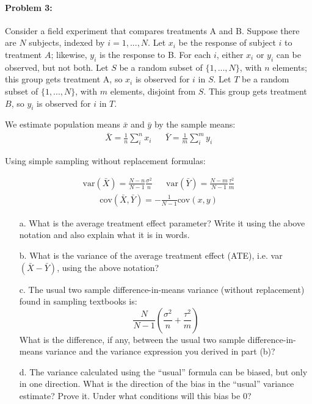 \documentclass{article}
\begin{document}
\paragraph{Problem 3:} Consider a field experiment that compares
treatments A and B. Suppose there are $N$ subjects, indexed by
$i=1,...,N$. Let $x_i$ be the response of subject $i$ to treatment
$A$; likewise, $y_i$ is the response to B. For each $i$, either $x_i$
or $y_i$ can be observed, but not both. Let $S$ be a random subset of
$\{1,...,N\}$, with $n$ elements; this group gets treatment A, so
$x_i$ is observed for $i$ in $S$. Let $T$ be a random subset of
$\{1,...,N\}$, with $m$ elements, disjoint from $S$. This group gets
treatment $B$, so $y_i$ is observed for $i$ in $T$.

We estimate population means $\bar x$ and $\bar y$ by the sample
means:
\begin{align*}
\bar X = \frac{1}{n} \sum_{i}^nx_i & &\bar Y = \frac{1}{m} \sum_{i}^my_i\end{align*}

Using simple sampling without replacement formulas:

\begin{align*}
\textrm{var}(\bar X) = \frac{N-n}{N-1}\frac{\sigma^2}{n}&
&\textrm{var}(\bar Y) = \frac{N-m}{N-1}\frac{\tau^2}{m}
\end{align*}
\begin{align*}
\textrm{cov}(\bar X, \bar Y)= -\frac{1}{N-1} \textrm{cov}(x,y)
\end{align*}


\begin{itemize}
\item[a.] What is the average treatment effect parameter? Write it
  using the above notation and also explain what it is in words. 
\item[b.] What is the variance of the average treatment effect (ATE), i.e. var$(\bar X - \bar Y)$, using the above notation? 
\item[c.] The usual two sample difference-in-means variance (without
  replacement)  found in sampling textbooks is:  
$$ \frac{N}{N-1} \left( \frac{\sigma^2}{n} + \frac{\tau^2}{m} \right)$$
What is the difference, if any, between the usual two sample
difference-in-means variance and the variance expression you derived
in part (b)?
\item[d.] The variance calculated using the ``usual'' formula can be biased, but only in one direction. What is the direction of the bias in the ``usual'' variance estimate? Prove it. Under what conditions will this bias be 0?
\end{itemize}
\end{document}
